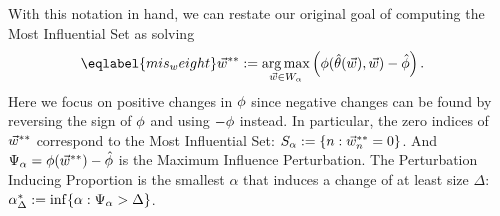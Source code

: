 With this notation in hand, we can restate our original goal of computing
the Most Influential Set as solving
%
\begin{align} \eqlabel{mis_weight}
	\w^{**} &:=
	\argmax_{\w \in W_\alpha}
   		 \left( \thetafun(\thetahat(\w), \w) - \thetafunhat \right).
\end{align}
%
Here we focus on positive changes in $\phi$ since negative changes can be
found by reversing the sign of $\phi$ and using $-\phi$ instead. In
particular, the zero indices of $\vec{w}^{**}$ correspond to the Most Influential
Set: $S_{\alpha} := \left\{n: \vec{w}^{**}_n = 0 \right\}$. And $\Psi_{\alpha} =
\phi(\vec{w}^{**}) - \hat{\phi}$ is the Maximum Influence Perturbation. The
Perturbation Inducing Proportion is the smallest $\alpha$ that induces a change
of at least size $\Delta$: $\alpha^*_{\Delta} := \inf\{ \alpha: \Psi_{\alpha} >
\Delta\}$.
